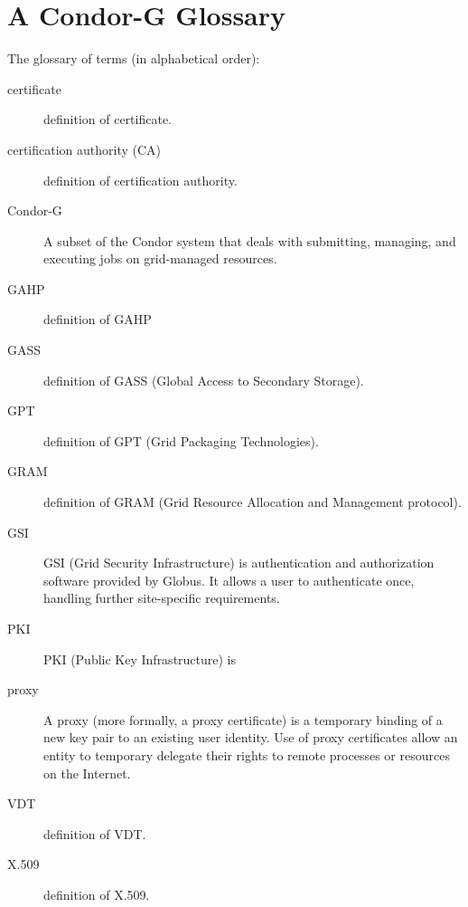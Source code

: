 \section{\label{sec:Condor-G-Glossary}A Condor-G Glossary}

The glossary of terms (in alphabetical order):

\begin{description} 

\item[certificate] definition of certificate.

\item[certification authority (CA)] definition of certification authority.

\item[Condor-G]
A subset of the Condor system that deals with
submitting, managing, and executing jobs on grid-managed resources.

\item[GAHP] definition of GAHP

\item[GASS] definition of GASS (Global Access to Secondary Storage).

\item[GPT] definition of GPT (Grid Packaging Technologies).

\item[GRAM] definition of GRAM (Grid Resource Allocation and Management
protocol).

\item[GSI] GSI (Grid Security Infrastructure) is 
authentication and authorization software provided by Globus.
It allows a user to authenticate once,
handling further site-specific requirements.

\item[PKI] PKI (Public Key Infrastructure) is 

\item[proxy] A proxy (more formally, a proxy certificate) is
a temporary binding of a new key pair to an existing user identity.
Use of proxy certificates allow an entity to temporary delegate
their rights to remote processes or resources on the Internet. 


\item[VDT] definition of VDT.

\item[X.509] definition of X.509.

\end{description} 

